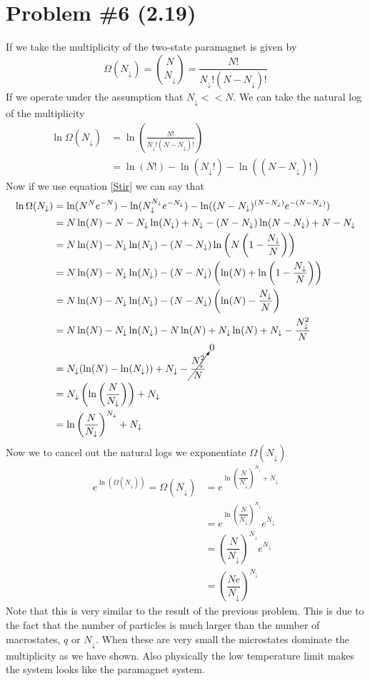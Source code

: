 \documentclass[11pt]{article}
\numberwithin{equation}{section}
\begin{document}
\section{Problem \#6 (2.19)}
If we take the multiplicity of the two-state paramagnet is given by
$$\Omega(N_{\downarrow}) ={N\choose N_{\downarrow}} = \frac{N!}{N_{\downarrow}!(N-N_{\downarrow})!}$$
If we operate under the assumption that $N_{\downarrow}<<N$. We can take the natural log of the multiplicity
\begin{align*}
\ln\Omega(N_{\downarrow}) &= \ln\left(\frac{N!}{N_{\downarrow}!(N-N_{\downarrow})!}\right)\\
&= \ln(N!) - \ln(N_{\downarrow}!) - \ln((N-N_{\downarrow})!)
\end{align*}
Now if we use equation \ref{Stir} we can say that
\begin{align*}
\ln\Omega(N_{\downarrow}) &= \ln(N^Ne^{-N}) - \ln(N_{\downarrow}^{N_{\downarrow}}e^{-N_{\downarrow}}) - \ln((N-N_{\downarrow})^{(N-N_{\downarrow})}e^{-(N-N_{\downarrow})})\\
&= N\ln(N) - N - N_{\downarrow}\ln(N_{\downarrow}) + N_{\downarrow} - (N-N_{\downarrow})\ln(N-N_{\downarrow}) + N - N_{\downarrow}\\
&= N\ln(N)  - N_{\downarrow}\ln(N_{\downarrow})  - (N-N_{\downarrow})\ln\left(N\left(1-\frac{N_{\downarrow}}{N}\right)\right) \\
&= N\ln(N)  - N_{\downarrow}\ln(N_{\downarrow})  - (N-N_{\downarrow})\left(\ln(N) + \ln\left(1-\frac{N_{\downarrow}}{N}\right)\right) \\
&= N\ln(N)  - N_{\downarrow}\ln(N_{\downarrow})  - (N-N_{\downarrow})\left(\ln(N) -\frac{N_{\downarrow}}{N}\right) \\
&= N\ln(N)  - N_{\downarrow}\ln(N_{\downarrow})  - N\ln(N) + N_{\downarrow}\ln(N) + N_{\downarrow} - \frac{N_{\downarrow}^2}{N}\\
&= N_{\downarrow}(\ln(N) - \ln(N_{\downarrow})) + N_{\downarrow} - \cancelto{0}{\frac{N_{\downarrow}^2}{N}}\\
&= N_{\downarrow}\left(\ln\left(\frac{N}{N_{\downarrow}}\right)\right) + N_{\downarrow} \\
&= \ln\left(\frac{N}{N_{\downarrow}}\right)^{N_{\downarrow}}+ N_{\downarrow} 
\end{align*}
Now we to cancel out the natural logs we exponentiate $\Omega(N_{\downarrow})$
\begin{align*}
e^{\ln(\Omega(N_{\downarrow}))} = \Omega(N_{\downarrow}) &= e^{\ln\left(\dfrac{N}{N_{\downarrow}}\right)^{N_{\downarrow}}+ N_{\downarrow}}\\
&= e^{\ln\left(\dfrac{N}{N_{\downarrow}}\right)^{N_{\downarrow}}} e^{N_{\downarrow}}\\
&= \left(\dfrac{N}{N_{\downarrow}}\right)^{N_{\downarrow}} e^{N_{\downarrow}}\\
&= \left(\dfrac{Ne}{N_{\downarrow}}\right)^{N_{\downarrow}} 
\end{align*}
Note that this is very similar to the result of the previous problem. This is due to the fact that the number of particles is much larger than the number of macrostates, $q$ or $N_{\downarrow}$. When these are very small the microstates dominate the multiplicity as we have shown. Also physically the low temperature limit makes the system looks like the paramagnet system.
\end{document}
